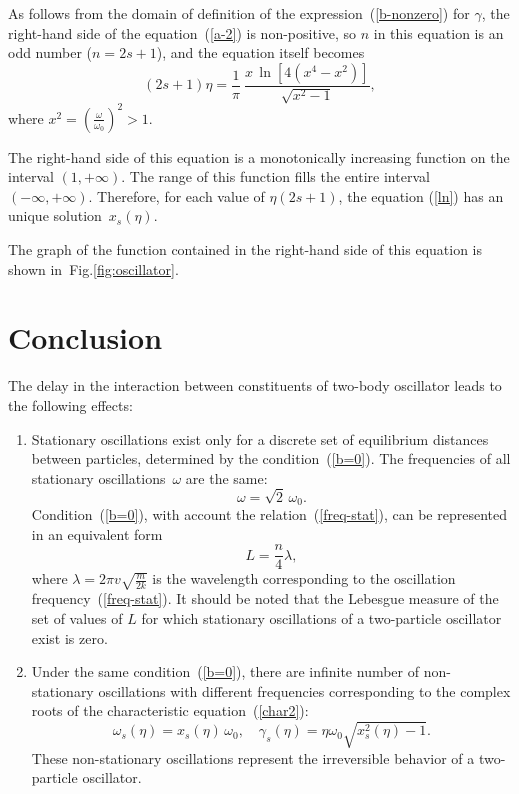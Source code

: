 \documentclass[a4,%
amsmath,amssymb,
12pt
]{revtex4-1}
\begin{document}
As follows from the domain of definition of the expression~(\ref {b-nonzero}) for $ \gamma $, the right-hand side of the equation~(\ref {a-2}) is non-positive, so $ n $ in this equation is an odd number ($ n = 2s + 1 $), and the equation itself becomes
\begin{equation}\label{ln}
(2s+1)\eta  = \frac{1}{\pi}\ \frac{x\,\ln \left[4\left( x^4 - x^2\right)  \right]}{\sqrt{x^2-1}}, 
\end{equation}
where $\displaystyle x^2= \left( \frac{\omega}{\omega_0}\right)^2 > 1$. 

The right-hand side of this equation is a monotonically increasing function on the interval $ (1, + \infty) $. The range of this function fills the entire interval $ (- \infty, + \infty) $. Therefore, for each value of $ \eta \left (2s + 1 \right) $, the equation (\ref {ln}) has an unique solution~$x_s(\eta)$.

The graph of the function contained in the right-hand side of this equation is shown in~Fig.\ref{fig:oscillator}.

\section{Conclusion}


The delay in the interaction between constituents of two-body oscillator leads to the following effects:
\begin{enumerate}
	\item Stationary oscillations exist only for a discrete set of equilibrium distances between particles, determined by the condition~(\ref{b=0}). The frequencies of all stationary oscillations~$\omega$ are the same:
	\begin{equation}\label{freq-stat}
	\omega = \sqrt{2}\, \omega_0.
	\end{equation}	
	Condition~(\ref{b=0}), with account the relation~(\ref{freq-stat}), can be represented in an equivalent form
	\begin{equation}\label{b=0-2}
	L = \frac{n}{4} \lambda,
	\end{equation} 
	where $ \lambda = 2\pi v\sqrt{\frac{m}{2 k}}$ is the wavelength corresponding to the oscillation frequency~(\ref{freq-stat}).   
	It should be noted that the Lebesgue measure of the set of values of $L$ for which stationary oscillations of a two-particle oscillator exist is zero. 
	\item Under the same condition~(\ref{b=0}), there are infinite number of non-stationary oscillations with different frequencies corresponding to the complex roots of the characteristic equation~(\ref{char2}):
	\begin{equation}\label{char3}
	\omega_s\left(\eta \right)  = x_s(\eta )\, \omega_0, \quad \gamma_s\left( \eta\right)  =\eta\omega_0 \sqrt{x_s^2(\eta)-1}.
	\end{equation} 
	These non-stationary oscillations represent the irreversible behavior of a two-particle oscillator.
\end{enumerate}
\end{document}
